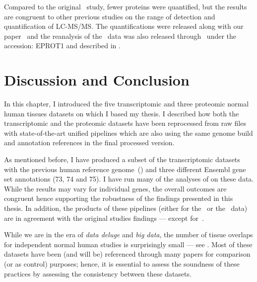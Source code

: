 Compared to the original \pandey\ study, fewer proteins were quantified, but
the results are congruent to other previous studies on the range of detection
and quantification of \gls{LC-MS/MS}.
The quantifications were released along with our paper~
and the reanalysis of the \pandey\ data was also released
through \egxa\ under the accession: E\textminus{}PROT\textminus{}1
and described in \citet{NAR2015,NatComm2016}.

\section{Discussion and Conclusion}

In this chapter, I introduced the five transcriptomic and three proteomic normal
human tissues datasets on which I based my thesis.
I described how both the transcriptomic and the proteomic datasets have been
reprocessed from raw files with state-of-the-art unified pipelines
which are also using the same genome build and annotation references in the
final processed version.

As mentioned before,
I have produced a subset of the transcriptomic datasets
with the previous human reference genome~() and
three different \gls{Ensembl} gene set annotations (73, 74 and 75).
I have run many of the analyses of  on
these data.
While the results may vary for individual genes,
the overall outcomes are congruent hence
supporting the robustness of the findings presented in this thesis.
In addition, the products of these pipelines (either for the \Rnaseq\ or the \ms\
data) are in agreement with the original studies findings ---
except for~\citet{PandeyData}.

While we are in the era of \emph{data deluge} and \emph{big data},
the number of tissue overlaps for independent normal human studies is surprisingly small
--- see \Crefp{fig:VennStudiesT}.
Most of these datasets have been (and will be) referenced through
many papers for comparison (or as control) purposes;
hence, it is essential to assess the soundness of these practices by assessing
the consistency between these datasets.

